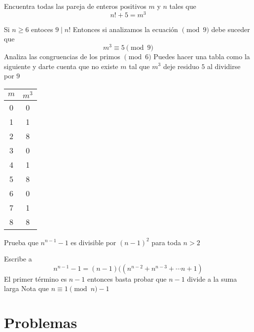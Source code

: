 \documentclass[11pt]{scrartcl}
\begin{document}
\begin{example}
Encuentra todas las pareja de enteros positivos $m$ y $n$ tales que
\[n!+5=m^3\]
\end{example}
\begin{walkthrough} 
\begin{walk}
 \ii Si $n\geq 6$ entoces $9\mid n!$
 \ii Entonces si analizamos la ecuación $\pmod 9$ debe suceder que
 \[m^3\equiv 5\pmod 9\]
    \ii  Analiza las congruencias de los primos $\pmod 6$
    \ii Puedes hacer una tabla como la siguiente y darte cuenta que no existe $m$ tal que $m^3$ deje residuo $5$ al dividirse por $9$
    \begin{center}
    \begin{tabular}{c|c}
        $m$ & $m^3$ \\ \hline 
        0 & 0 \\
        1 & 1\\
        2 & 8\\
        3& 0\\
        4 & 1\\
        5 & 8\\
        6 & 0\\
        7 & 1\\
        8 & 8\\
    \end{tabular}
     \end{center}
\end{walk}
\end{walkthrough}

\begin{example}
Prueba que $n^{n-1}-1$ es divisible por $(n-1)^2$ para toda $n > 2$
\end{example}
\begin{walkthrough} 
\begin{walk}
    \ii  Escribe a 
    \[n^{n-1}-1=(n-1)(\left( n^{n-2}+n^{n-3}+\cdots n+1 \right)\]
    \ii El primer término es $n-1$ entonces basta probar que $n-1$ divide a la suma larga
    \ii Nota que $n\equiv 1\pmod n-1$
\end{walk}
\end{walkthrough}



\section{Problemas}
\end{document}
